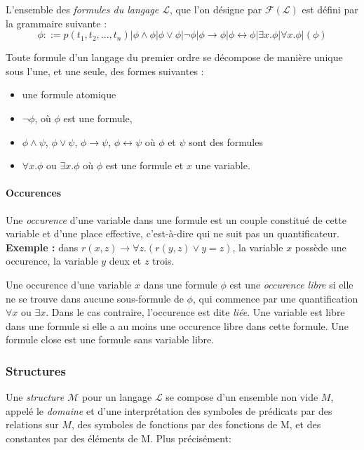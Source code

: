 \documentclass[a4paper]{article}
\begin{document}
  L'ensemble des \textit{formules du langage $\mathcal{L}$}, que l'on 
désigne par
  $\mathcal{F}(\mathcal{L})$ est défini par la grammaire suivante :
  $$ \phi ::= p(t_1, t_2,...,t_n) | \phi \land \phi | \phi \lor \phi | 
\lnot \phi | \phi \rightarrow \phi | \phi \leftrightarrow \phi | \exists 
x.\phi | \forall x.\phi | (\phi) $$

  Toute formule d'un langage du premier ordre se décompose de manière 
unique sous
  l'une, et une seule, des formes suivantes :
  \begin{itemize}
    \item une formule atomique
    \item $\lnot \phi$, où $\phi$ est une formule,
    \item $\phi \land \psi$, $\phi \lor \psi$, $\phi \rightarrow \psi$, 
$\phi \leftrightarrow \psi$
    où $\phi$ et $\psi$ sont des formules
    \item $\forall x. \phi$ ou $ \exists x.\phi$ où $\phi$ est une 
formule et $x$ une variable.
   \end{itemize}

   \paragraph{Occurences}
   Une \textit{occurence} d'une variable dans une formule est un couple 
constitué
   de cette variable et d'une place effective, c'est-à-dire qui ne suit 
pas 
   un quantificateur. \textbf{Exemple :} dans $r(x,z) \rightarrow 
\forall z.(r(y,z) \lor y = z)$,
   la variable $x$ possède une occurence, la variable $y$ deux et $z$ 
trois.

   Une occurence d'une variable $x$ dans une formule $\phi$ est une 
\textit{occurence libre}
   si elle ne se trouve dans aucune sous-formule de $\phi$, qui commence 
par une
   quantification $\forall x$ ou $\exists x$. Dans le cas contraire, 
l'occurence
   est dite \textit{liée}. Une variable est libre dans une formule si 
elle a 
   au moins une occurence libre dans cette formule. Une formule close 
est une formule
   sans variable libre.

   \subsubsection{Structures}
   Une \textit{structure $\mathcal{M}$} pour un langage $\mathcal{L}$ se 
compose
   d'un ensemble non vide $M$, appelé le \textit{domaine} et d'une 
interprétation des
   symboles de prédicats par des relations sur $M$, des symboles de 
fonctions
   par des fonctions de M, et des constantes par des éléments de M. Plus 
précisément:
\end{document}
